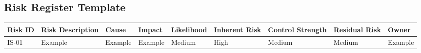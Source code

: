 \documentclass[
  letterpaper,
  DIV=11,
  numbers=noendperiod]{scrartcl}
\begin{document}
\subsection{Risk Register Template}\label{risk-register-template}

\begin{longtable}[]{@{}
  >{\raggedright\arraybackslash}p{}
  >{\raggedright\arraybackslash}p{}
  >{\raggedright\arraybackslash}p{}
  >{\raggedright\arraybackslash}p{}
  >{\raggedright\arraybackslash}p{}
  >{\raggedright\arraybackslash}p{}
  >{\raggedright\arraybackslash}p{}
  >{\raggedright\arraybackslash}p{}
  >{\raggedright\arraybackslash}p{}@{}}
\toprule\noalign{}
\begin{minipage}[b]{\linewidth}\raggedright
Risk ID
\end{minipage} & \begin{minipage}[b]{\linewidth}\raggedright
Risk Description
\end{minipage} & \begin{minipage}[b]{\linewidth}\raggedright
Cause
\end{minipage} & \begin{minipage}[b]{\linewidth}\raggedright
Impact
\end{minipage} & \begin{minipage}[b]{\linewidth}\raggedright
Likelihood
\end{minipage} & \begin{minipage}[b]{\linewidth}\raggedright
Inherent Risk
\end{minipage} & \begin{minipage}[b]{\linewidth}\raggedright
Control Strength
\end{minipage} & \begin{minipage}[b]{\linewidth}\raggedright
Residual Risk
\end{minipage} & \begin{minipage}[b]{\linewidth}\raggedright
Owner
\end{minipage} \\
\midrule\noalign{}
\endhead
\bottomrule\noalign{}
\endlastfoot
IS-01 & Example & Example & Example & Medium & High & Medium & Medium &
Example \\
\end{longtable}
\end{document}

